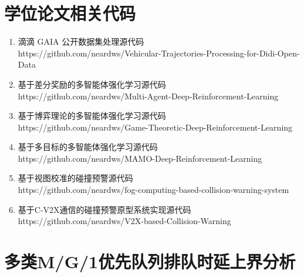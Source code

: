 \section{学位论文相关代码}
\begin{enumerate}
	\item 滴滴 GAIA 公开数据集处理源代码\\https://github.com/neardws/Vehicular-Trajectories-Processing-for-Didi-Open-Data
	\item 基于差分奖励的多智能体强化学习源代码\\https://github.com/neardws/Multi-Agent-Deep-Reinforcement-Learning
	\item 基于博弈理论的多智能体强化学习源代码\\https://github.com/neardws/Game-Theoretic-Deep-Reinforcement-Learning
	\item 基于多目标的多智能体强化学习源代码\\https://github.com/neardws/MAMO-Deep-Reinforcement-Learning
	\item 基于视图校准的碰撞预警源代码\\https://github.com/neardws/fog-computing-based-collision-warning-system
	\item 基于C-V2X通信的碰撞预警原型系统实现源代码\\https://github.com/neardws/V2X-based-Collision-Warning
\end{enumerate}

\section{多类M/G/1优先队列排队时延上界分析}\label{appendix e}

